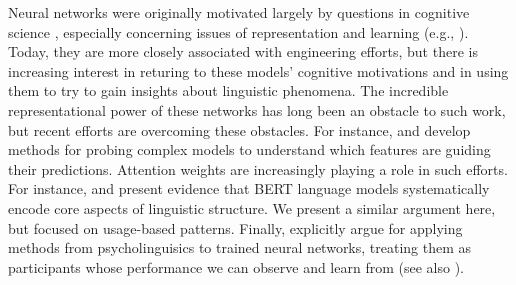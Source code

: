 \documentclass[11pt,a4paper]{article}
\newcommand{\ek}[1]{\textcolor{Orange}{[ek: #1]}}
\begin{document}
Neural networks were originally motivated largely by questions in cognitive science \citep{pater2019generative}, especially concerning issues of representation and learning (e.g., \citep{rumelhart1986learning,tesar2000learnability}). Today, they are more closely associated with engineering efforts, but there is increasing interest in returing to these models' cognitive motivations and in using them to try to gain insights about linguistic phenomena. The incredible representational power of these networks has long been an obstacle to such work, but recent efforts are overcoming these obstacles. For instance, \citet{N16-3020} and \citet{Koh:Liang:2017} develop methods for probing complex models to understand which features are guiding their predictions. Attention weights are increasingly playing a role in such efforts. For instance, \citet{jawahar-etal-2019-bert} and \citet{tenney-etal-2019-bert} present evidence that BERT language models systematically encode core aspects of linguistic structure. We present a similar argument here, but focused on usage-based patterns. Finally, \citet{linzen-etal-2016-assessing} explicitly argue for applying methods from psycholinguisics to trained neural networks, treating them as participants whose performance we can observe and learn from (see also \citealt{gulordava-etal-2018-colorless,Futrell-etal:2019}).







\end{document}
